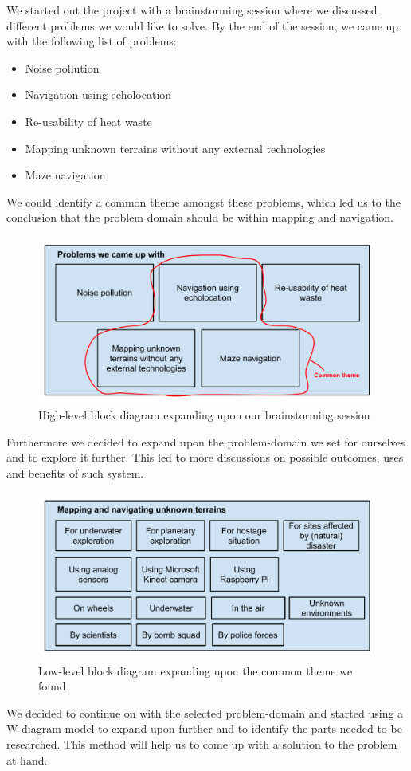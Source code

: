 We started out the project with a brainstorming session where we discussed different problems we would like to solve. By the end of the session, we came up with the following list of problems:
\begin{itemize}
	\item Noise pollution
	\item Navigation using echolocation
	\item Re-usability of heat waste
	\item Mapping unknown terrains without any external technologies
	\item Maze navigation
\end{itemize}

We could identify a common theme amongst these problems, which led us to the conclusion that the problem domain should be within mapping and navigation. 

\begin{figure}[!h]
	\centering
	\includegraphics[scale=.7]{images/high-level-block.pdf}
	\caption{High-level block diagram expanding upon our brainstorming session}
	\label{fig:highlevelblock}
\end{figure}

Furthermore we decided to expand upon the problem-domain we set for ourselves and to explore it further. This led to more discussions on possible outcomes, uses and benefits of such system.

\begin{figure}[!h]
	\centering
	\includegraphics[scale=.7]{images/low-level-block.pdf}
	\caption{Low-level block diagram expanding upon the common theme we found}
	\label{fig:lowlevelblock}
\end{figure}

We decided to continue on with the selected problem-domain and started using a W-diagram model to expand upon further and to identify the parts needed to be researched. This method will help us to come up with a solution to the problem at hand.